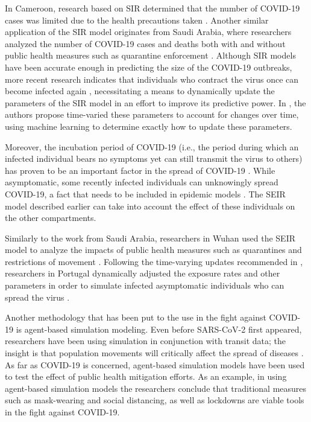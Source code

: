In Cameroon, research based on SIR determined that the number of COVID-19 cases was limited due to the health precautions taken \cite{Nguemdjo:2020}. Another similar application of the SIR model originates from Saudi Arabia, where researchers analyzed the number of COVID-19 cases and deaths both with and without public health measures such as quarantine enforcement \cite{Singh:2020}. Although SIR models have been accurate enough in predicting the size of the COVID-19 outbreaks, more recent research indicates that individuals who contract the virus once can become infected again \cite{Gallagher:2021}, necessitating a means to dynamically update the parameters of the SIR model in an effort to improve its predictive power. In \cite{Chen}, the authors propose time-varied these parameters to account for changes over time, using machine learning to determine exactly how to update these parameters. 

Moreover, the incubation period of COVID-19 (i.e., the period during which an infected individual bears no symptoms yet can still transmit the virus to others) has proven to be an important factor in the spread of COVID-19 \cite{Hoehl:2020}. While asymptomatic, some recently infected individuals can unknowingly spread COVID-19, a fact that needs to be included in epidemic models \cite{Patil:2020}. The SEIR model described earlier can take into account the effect of these individuals on the other compartments.
 
Similarly to the work from Saudi Arabia, researchers in Wuhan used the SEIR model to analyze the impacts of public health measures such as quarantines and restrictions of movement \cite{Hou:2020}. Following the time-varying updates recommended in \cite{Chen}, researchers in Portugal dynamically adjusted the exposure rates and other parameters in order to simulate infected asymptomatic individuals who can spread the virus \cite{Teles:2020}. 

Another methodology that has been put to the use in the fight against COVID-19 is agent-based simulation modeling. Even before SARS-CoV-2 first appeared, researchers have been using simulation in conjunction with transit data; the insight is that population movements will critically affect the spread of diseases \cite{Agent-BasedTransportationModels}. As far as COVID-19 is concerned, agent-based simulation models have been used to test the effect of public health mitigation efforts. As an example, in \cite{SILVA2020110088} using agent-based simulation models the researchers conclude that traditional measures such as mask-wearing and social distancing, as well as lockdowns are viable tools in the fight against COVID-19.

